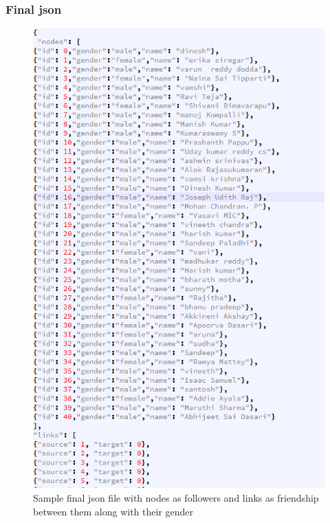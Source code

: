 \subsubsection{Final json}
\begin{figure}[ht]    
    \begin{center}
        \includegraphics[scale=0.6]{sample_gender_json.png}
        \caption{Sample final json file with nodes as followers and links as friendship between them along with their gender}
        \label{Sample_t2}
    \end{center}
\end{figure}
\newpage

